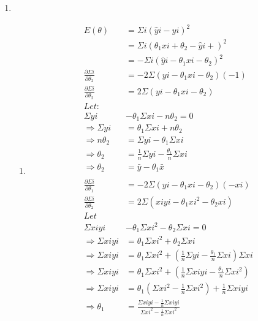 \documentclass{article}
\begin{document}
\begin{enumerate}
\begin{enumerate}[label=\arabic*)]
			\item
				\begin{enumerate}[label=\alph*)]
				\item
				\begin{align*}
					E(\theta) &= \Sigma i(\hat yi - yi)^2 \\
					          &= \Sigma i(\theta_1xi + \theta_2 - \hat yi + )^2 \\
					          &= -\Sigma i(\hat yi - \theta_1xi - \theta_2)^2 \\
					\frac{\partial \Sigma i}{\partial \theta_2} &= -2 \Sigma(yi - \theta_1xi - \theta_2)(-1)\\
					\frac{\partial \Sigma i}{\partial \theta_2} &= 2 \Sigma(yi - \theta_1xi - \theta_2)\\
					Let: \\
					\Sigma yi & - \theta_1 \Sigma xi -n\theta_2 = 0 \\
					\Rightarrow \Sigma yi & = \theta_1 \Sigma xi + n\theta_2 \\
					\Rightarrow n\theta_2 & = \Sigma yi - \theta_1 \Sigma xi \\
					\Rightarrow \theta_2 & = \frac{1}{n}\Sigma yi - \frac{\theta_1 }{n} \Sigma xi \\
					\Rightarrow \theta_2 & = \bar y - \theta_1 \bar x \\ \\
					\frac{\partial \Sigma i}{\partial \theta_1} &= -2 \Sigma(yi - \theta_1xi - \theta_2)(-xi)\\				
					\frac{\partial \Sigma i}{\partial \theta_2} &= 2 \Sigma(xiyi - \theta_1xi^2 - \theta_2 xi)\\
					Let\\
					\Sigma xiyi & - \theta_1 \Sigma xi^2 -\theta_2 \Sigma xi = 0 \\
					\Rightarrow \Sigma xiyi & = \theta_1 \Sigma xi^2 + \theta_2 \Sigma xi \\
					\Rightarrow \Sigma xiyi & = \theta_1 \Sigma xi^2 + (\frac{1}{n}\Sigma yi - \frac{\theta_1 }{n} \Sigma xi) \Sigma xi \\
					\Rightarrow \Sigma xiyi & = \theta_1 \Sigma xi^2 + (\frac{1}{n}\Sigma xiyi - \frac{\theta_1 }{n} \Sigma xi^2) \\
					\Rightarrow \Sigma xiyi & = \theta_1 (\Sigma xi^2 - \frac{1}{n}\Sigma xi^2) + \frac{1}{n}\Sigma xiyi \\
					\Rightarrow \theta_1 & = \frac{\Sigma xiyi - \frac{1}{n}\Sigma xiyi}{\Sigma xi^2 - \frac{1}{n}\Sigma xi^2} \\

\end{align*}
\end{enumerate}
\end{enumerate}
\end{enumerate}
\end{document}
